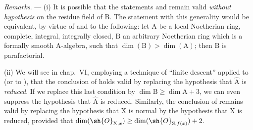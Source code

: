 \begin{env}[21.14.4]
\label{IV.21.14.4}
\emph{Remarks}. ---
(i) It is possible that the statements  and  remain valid \emph{without hypothesis} on the residue field of $\mathrm{B}$.
The statement with this generality would be equivalent, by virtue of  and  to the following: let $\mathrm{A}$ be a local Noetherian ring, complete, integral, integrally closed, $\mathrm{B}$ an arbitrary Noetherian ring which is a formally smooth A-algebra, such that $\dim(\mathrm{B})>\dim(\mathrm{A})$; then $\mathrm{B}$ is parafactorial.

(ii) We will see in chap.~VI, employing a technique of ``finite descent'' applied to  (or to ), that the conclusion of  holds valid by replacing the hypothesis that $\widehat{\mathrm{A}}$ is \emph{reduced}.
If we replace this last condition by $\dim\mathrm{B}\geq\dim\mathrm{A}+3$, we can even suppress the hypothesis that $\widehat{\mathrm{A}}$ is reduced.
Similarly, the conclusion of  remains valid by replacing the hypothesis that $\mathrm{X}$ is normal by the hypothesis that $\mathrm{X}$ is reduced, provided that $\dim(\sh{O}_{\mathrm{X},x})\geq\dim(\sh{O}_{\mathrm{S},f(x)})+2$.


\end{env}
